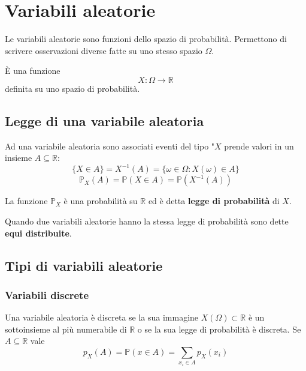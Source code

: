 \newpage
\section{Variabili aleatorie}
Le variabili aleatorie sono funzioni dello spazio di probabilità. Permettono di scrivere osservazioni diverse fatte su uno stesso spazio $\Omega$.
\begin{definition}
	È una funzione
	\begin{equation}
		X : \Omega \to \mathbb{R}
	\end{equation}
	definita su uno spazio di probabilità.
\end{definition}
\subsection{Legge di una variabile aleatoria}
Ad una variabile aleatoria sono associati eventi del tipo "$X$ prende valori in un insieme $A\subseteq \mathbb{R}$:
\begin{equation*}
	\{X \in A\} = X^{-1}(A)=\{\omega \in \Omega: X(\omega) \in A\}
\end{equation*}
\begin{equation*}
	\mathbb{P}_X(A)=\mathbb{P}(X \in A)=\mathbb{P}(X^{-1}(A))
\end{equation*}

\begin{definition}
	La funzione $\mathbb{P}_X$ è una probabilità su $\mathbb{R}$ ed è detta \textbf{legge di probabilità} di $X$.
\end{definition}

\begin{note}
	Quando due variabili aleatorie hanno la stessa legge di probabilità sono dette \textbf{equi distribuite}.
\end{note}

\subsection{Tipi di variabili aleatorie}
\subsubsection{Variabili discrete}
\begin{definition}
	Una variabile aleatoria è discreta se la sua immagine $X(\Omega) \subset \mathbb{R}$ è un sottoinsieme al più numerabile di $\mathbb{R}$ o se la sua legge di probabilità è discreta.
	Se $A \subseteq \mathbb{R}$ vale
	\begin{equation*}
		p_X(A)=\mathbb{P}(x \in A) = \sum_{x_i \in A}p_X(x_i)
	\end{equation*}
\end{definition}
